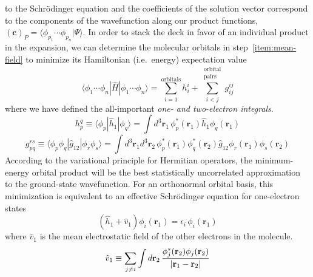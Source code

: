 to the Schr\"odinger equation and the coefficients of the solution vector
correspond to the components of the wavefunction along our product functions,
\(
    (\mathbf{c})_P
    =
    \langle \phi_{p_1}\cdots \phi_{p_n}|\Psi\rangle
\).
In order to stack the deck in favor of an individual product in the expansion,
we can determine the molecular orbitals in step~\ref{item:mean-field} to
minimize its Hamiltonian (i.e.~energy) expectation value
\begin{equation}
    \label{eq:introduction:orbital-product-expectation-value}
    \langle \phi_1\cdots \phi_n|
    \hat{H}
    |\phi_1\cdots \phi_n \rangle
    =
    \sum_{i=1}^\mathrm{orbitals}
    h_i^i
    +
    \sum_{i<j}^{\substack{\mathrm{orbital}\\\mathrm{pairs}}}
    g_{ij}^{ij}
\end{equation}
where we have defined the all-important {\itshape one- and two-electron
integrals}.
\begin{equation}
    h_p^q
    \equiv
    \langle\phi_p|\hat{h}_1|\phi_q\rangle
    =
    \int
    d^3\mathbf{r}_1\,
    \phi_p^*(\mathbf{r}_1)
    \hat{h}_1
    \phi_q(\mathbf{r}_1)
\end{equation}
\begin{equation}
    g_{pq}^{rs}
    \equiv
    \langle\phi_p\phi_q|\hat{g}_{12}|\phi_r\phi_s\rangle
    =
    \int
    d^3\mathbf{r}_1
    d^3\mathbf{r}_2\,
    \phi_p^*(\mathbf{r}_1)
    \phi_q^*(\mathbf{r}_2)
    \hat{g}_{12}
    \phi_r(\mathbf{r}_1)
    \phi_s(\mathbf{r}_2)
\end{equation}
According to the variational principle for Hermitian operators, the
minimum-energy orbital product will be the best statistically uncorrelated
approximation to the ground-state wavefunction.
For an orthonormal orbital basis, this minimization is equivalent to an
effective Schr\"odinger equation for one-electron states
\begin{equation}
    \label{eq:introduction:mean-field-orbitals}
    (
        \hat{h}_1
        +
        \hat{v}_1
    )
    \phi_i(\mathbf{r}_1)
    =
    \epsilon_i\,
    \phi_i(\mathbf{r}_1)
\end{equation}
where \(\hat{v}_1\) is the mean electrostatic field of the other electrons in
the molecule.
\begin{equation}
    \hat{v}_1
    \equiv
    \sum_{j\neq i}
    \int
    d\mathbf{r}_2\,
    \frac{%
        \phi_j^*(\mathbf{r}_2)\phi_j(\mathbf{r}_2)
    }{%
        |\mathbf{r}_1 - \mathbf{r}_2|
    }
\end{equation}
